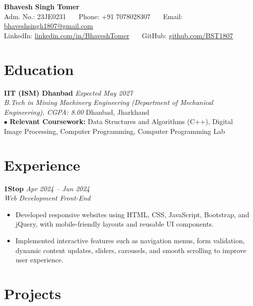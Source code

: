 \documentclass[a4paper,10pt]{article}
\begin{document}
\begin{center}
    {\LARGE \textbf{Bhavesh Singh Tomer}} \\ \vspace{2pt}
    \small Adm. No.: 23JE0231 \ \textbar\ \ Phone: +91 7078028307 \ \textbar\ \ Email: \href{mailto:bhaveshsingh1807@gmail.com}{bhaveshsingh1807@gmail.com} \\
    LinkedIn: \href{https://linkedin.com/in/BhaveshTomer}{linkedin.com/in/BhaveshTomer} \ \textbar\ \ GitHub: \href{https://github.com/BST1807}{github.com/BST1807}
\end{center}
\vspace{-6pt}

\section{Education}
\textbf{IIT (ISM) Dhanbad} \hfill \textit{Expected May 2027} \\
\textit{B.Tech in Mining Machinery Engineering (Department of Mechanical Engineering), CGPA: 8.00} \hfill Dhanbad, Jharkhand \\
\vspace{1pt}
$\bullet$ \textbf{Relevant Coursework:} Data Structures and Algorithms (C++), Digital Image Processing, Computer Programming, Computer Programming Lab

\section{Experience}
\textbf{1Stop} \hfill \textit{Apr 2024 -- Jun 2024} \\
\textit{Web Development Front-End}
\begin{itemize}
    \item Developed responsive websites using HTML, CSS, JavaScript, Bootstrap, and jQuery, with mobile-friendly layouts and reusable UI components.
    \item Implemented interactive features such as navigation menus, form validation, dynamic content updates, sliders, carousels, and smooth scrolling to improve user experience.
\end{itemize}

\section{Projects}
\end{document}
